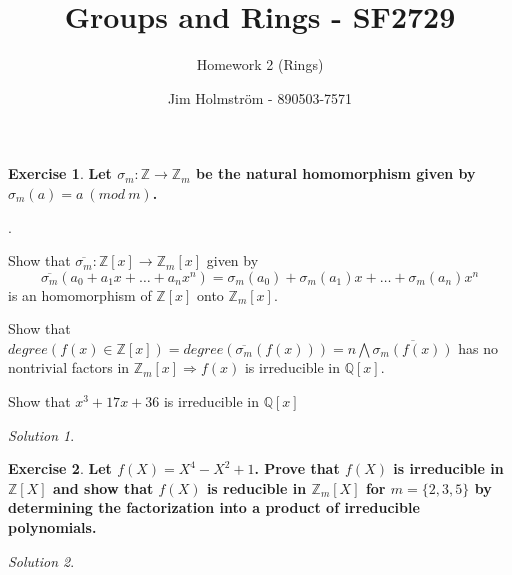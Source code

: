 \documentclass[a4paper,twoside=false,abstract=false,numbers=noenddot,
titlepage=false,headings=small,parskip=half,version=last]{scrartcl}
\author{Jim Holmström - 890503-7571}
\title{Groups and Rings - SF2729}
\subtitle{Homework 2 (Rings)}
\theoremstyle{definition}
\newtheorem{exercise}{Exercise}
\theoremstyle{remark}
\newtheorem*{solution}{Solution}
\newcommand{\ZZ}{\ensuremath{\mathbb{Z}}}
\newcommand{\QQ}{\ensuremath{\mathbb{Q}}}
\newcounter{qc}
\begin{document}
\maketitle
\thispagestyle{empty}

\begin{exercise}
{\bf
Let $\sigma_m : \ZZ \rightarrow \ZZ_m$ be the natural homomorphism given by
$\sigma_m(a)= a~(mod~m)$.
\begin{list}
{.}
{
    \bfseries
    \setlength{}
}
    \item Show that
    $\overline{\sigma_m}:\ZZ\left[x\right]\rightarrow\ZZ_m\left[x\right]$ given
    by
    \begin{equation}
        \overline{\sigma_m}(a_0+a_1x+\hdots+a_nx^n)=
        \sigma_m(a_0)+\sigma_m(a_1)x+\hdots+\sigma_m(a_n)x^n
    \end{equation}
    is an homomorphism of $\ZZ\left[x\right]$ onto $\ZZ_m\left[x\right]$.
    \item Show that
    $degree(f(x)\in\ZZ\left[x\right])=degree(\overline{\sigma_m}(f(x)))=n
    \bigwedge \overline{\sigma_m(f(x))}$ has no nontrivial factors in
    $\ZZ_m\left[x\right] \Rightarrow f(x)$ is irreducible in $\QQ\left[x\right]$.
    \item Show that $x^3+17x+36$ is irreducible in $\QQ\left[x\right]$
\end{list}

}
\end{exercise}
\begin{solution}
\end{solution}

\begin{exercise}
{\bf
Let $f(X)=X^4-X^2+1$. Prove that $f(X)$ is irreducible in $\ZZ\left[X\right]$
and show that $f(X)$ is reducible in $\ZZ_m\left[X\right]$ for
$m=\{2,3,5\}$ by determining the factorization into a product of
irreducible polynomials.
}
\end{exercise}
\begin{solution}

\end{solution}

\end{document}
